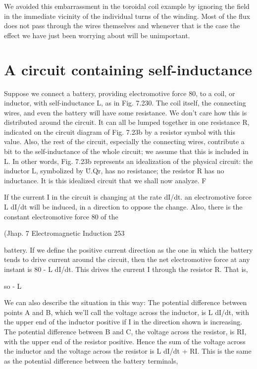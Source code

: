 We avoided this embarrassment in the toroidal coil example by
ignoring the field in the immediate vicinity of the individual turns of
the winding. Most of the flux does not pass through the wires themselves
and whenever that is the case the effect we have just been
worrying about will be unimportant.

\section{A circuit containing self-inductance}

Suppose we connect a battery, providing electromotive force 80,
to a coil, or inductor, with self-inductance L, as in Fig. 7.230. The
coil itself, the connecting wires, and even the battery will have some
resistance. We don't care how this is distributed around the circuit.
It can all be lumped together in one resistance R, indicated on the
circuit diagram of Fig. 7.23b by a resistor symbol with this value.
Also, the rest of the circuit, especially the connecting wires, contribute
a bit to the self-inductance of the whole circuit; we assume that
this is included in L. In other words, Fig. 7.23b represents an
idealization of the physical circuit: the inductor L, symbolized by
\.U.Qr, has no resistance; the resistor R has no inductance. It is
this idealized circuit that we shall now analyze. F

If the current I in the circuit is changing at the rate dI/dt. an electromotive
force L dI/dt will be induced, in a direction to oppose the
change. Also, there is the constant electromotive force 80 of the

(Jhap. 7 Electromagnetic Induction 253

battery. If we define the positive current direction as the one in
which the battery tends to drive current around the circuit, then the
net electromotive force at any instant is 80 - L dI/dt. This drives
the current I through the resistor R. That is,

\begin{equation}
\end{equation}
so - L%

We can also describe the situation in this way: The potential difference
between points A and B, which we'll call the voltage across
the inductor, is L dI/dt, with the upper end of the inductor positive
if I in the direction shown is increasing. The potential difference
between B and C, the voltage across the resistor, is RI, with the upper
end of the resistor positive. Hence the sum of the voltage across the
inductor and the voltage across the resistor is L dI/dt + RI. This is
the same as the potential difference between the battery terminals,

